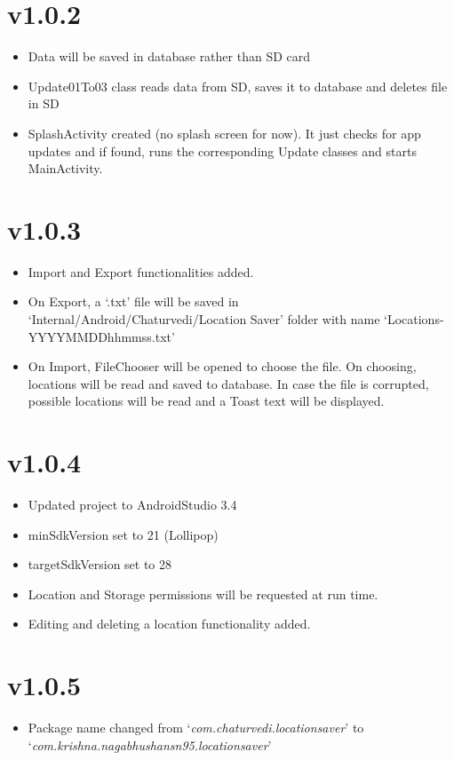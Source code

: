 \documentclass{article}
\begin{document}
\section{v1.0.2}
\begin{itemize}
\item Data will be saved in database rather than SD card
\item Update01To03 class reads data from SD, saves it to database and deletes file in SD
\item SplashActivity created (no splash screen for now). It just checks for app updates and if found, runs the corresponding Update classes and starts MainActivity.
\end{itemize}

\section{v1.0.3}
\begin{itemize}
\item Import and Export functionalities added.
\item On Export, a `.txt' file will be saved in `Internal/Android/Chaturvedi/Location Saver' folder with name `Locations-YYYYMMDDhhmmss.txt'
\item On Import, FileChooser will be opened to choose the file. On choosing, locations will be read and saved to database. In case the file is corrupted, possible locations will be read and a Toast text will be displayed.
\end{itemize}

\section{v1.0.4}
\begin{itemize}
\item Updated project to AndroidStudio 3.4
\item minSdkVersion set to 21 (Lollipop)
\item targetSdkVersion set to 28
\item Location and Storage permissions will be requested at run time.
\item Editing and deleting a location functionality added.
\end{itemize}

\section{v1.0.5}
\begin{itemize}
\item Package name changed from `\textit{com.chaturvedi.locationsaver}' to `\textit{com.krishna.nagabhushansn95.locationsaver}'
\end{itemize}
\end{document}
